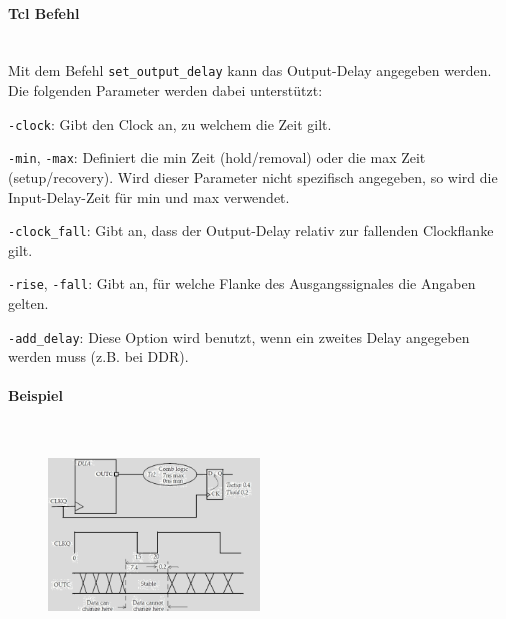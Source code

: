 \paragraph{Tcl Befehl}$~$ \\
Mit dem Befehl \texttt{set\_output\_delay} kann das Output-Delay angegeben werden. Die folgenden Parameter werden dabei unterstützt:
\begin{compactitem}
    \item \texttt{-clock}: Gibt den Clock an, zu welchem die Zeit gilt.
    \item \texttt{-min}, \texttt{-max}: Definiert die min Zeit (hold/removal) oder die max Zeit (setup/recovery). Wird dieser Parameter nicht spezifisch angegeben, so wird die Input-Delay-Zeit für min und max verwendet.
    \item \texttt{-clock\_fall}: Gibt an, dass der Output-Delay relativ zur fallenden Clockflanke gilt.
    \item \texttt{-rise}, \texttt{-fall}: Gibt an, für welche Flanke des Ausgangssignales die Angaben gelten.
    \item \texttt{-add\_delay}: Diese Option wird benutzt, wenn ein zweites Delay angegeben werden muss (z.B. bei DDR).
\end{compactitem}

\paragraph{Beispiel}$~$ \\
\begin{figure}[H]
    \includegraphics[width=0.5\textwidth]{images/output_delay.png}
\end{figure}

